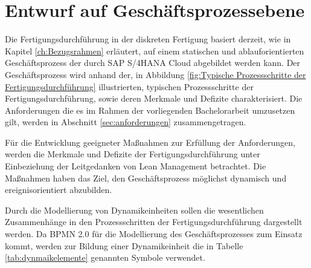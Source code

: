 \section{Entwurf auf Geschäftsprozessebene}\label{sec:modellierung}
Die Fertigungsdurchführung in der diskreten Fertigung basiert derzeit, wie in Kapitel \ref{ch:Bezugsrahmen} erläutert, auf einem statischen und ablauforientierten Geschäftsprozess der durch SAP S/4HANA Cloud abgebildet werden kann. Der Geschäftsprozess wird anhand der, in Abbildung \ref{fig:Typische Prozessschritte der Fertigungsdurchführung} illustrierten, typischen Prozessschritte der Fertigungsdurchführung, sowie deren Merkmale und Defizite charakterisiert. Die Anforderungen die es im Rahmen der vorliegenden Bachelorarbeit umzusetzen gilt, werden in Abschnitt \ref{sec:anforderungen} zusammengetragen.

Für die Entwicklung geeigneter Maßnahmen zur Erfüllung der Anforderungen, werden die Merkmale und Defizite der Fertigungsdurchführung unter Einbeziehung der Leitgedanken von Lean Management betrachtet. Die Maßnahmen haben das Ziel, den Geschäftsprozess möglichst dynamisch und ereignisorientiert abzubilden.

Durch die Modellierung von Dynamikeinheiten sollen die wesentlichen Zusammenhänge in den Prozessschritten der Fertigungsdurchführung dargestellt werden. Da \ac{BPMN} 2.0 für die Modellierung des Geschäftsprozesses zum Einsatz kommt, werden zur Bildung einer Dynamikeinheit die in Tabelle \ref{tab:dynmaikelemente} genannten Symbole verwendet.

